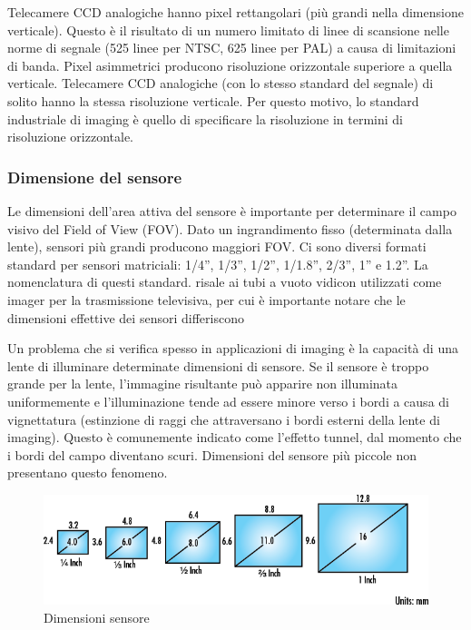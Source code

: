 Telecamere CCD analogiche hanno pixel rettangolari (più grandi nella dimensione verticale). Questo è il risultato di un numero limitato di linee di scansione nelle norme di segnale (525 linee per NTSC, 625 linee per PAL) a causa di limitazioni di banda. Pixel asimmetrici producono risoluzione orizzontale superiore a quella verticale. Telecamere CCD analogiche (con lo stesso standard del segnale) di solito hanno la stessa risoluzione verticale. Per questo motivo, lo standard industriale di imaging è quello di specificare la risoluzione in termini di risoluzione orizzontale.

\subsubsection{Dimensione del sensore}

Le dimensioni dell'area attiva del sensore  è importante per determinare il campo visivo del Field of View (FOV). 
Dato un ingrandimento fisso (determinata dalla lente), sensori più grandi producono maggiori FOV. Ci sono diversi formati standard per sensori matriciali: 1/4'', 1/3'', 1/2'', 1/1.8'', 2/3'', 1'' e 1.2''. La nomenclatura di questi standard. risale ai tubi a vuoto vidicon utilizzati come imager per la trasmissione televisiva, per cui è importante notare che le dimensioni effettive dei sensori differiscono 

Un problema che si verifica spesso in applicazioni di imaging è la capacità di una lente di illuminare determinate dimensioni di sensore. Se il sensore è troppo grande per la lente, l'immagine risultante può apparire non illuminata uniformemente e l'illuminazione tende ad essere minore verso i bordi a causa di vignettatura (estinzione di raggi che attraversano i bordi esterni della lente di imaging). Questo è comunemente indicato come l'effetto tunnel, dal momento che i bordi del campo diventano scuri. Dimensioni del sensore più piccole non presentano questo fenomeno.

\begin{figure}[!ht]
\centering
\includegraphics[width=.8\textwidth]{img/dimensione-sensore.png}
\caption{Dimensioni sensore}
\label{fig:dimensioni-sensore}
\end{figure}

